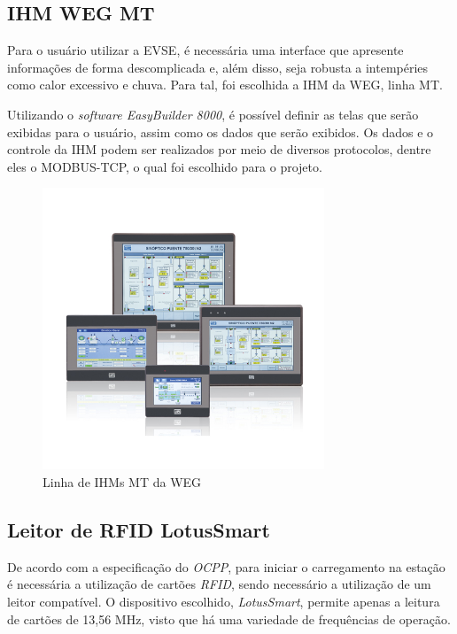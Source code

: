     \subsection{IHM WEG MT}
    \label{methodology:devices:ihm}

      Para o usuário utilizar a \ac{EVSE}, é necessária uma interface que apresente informações de forma descomplicada e, além disso, seja robusta a intempéries como calor excessivo e chuva. Para tal, foi escolhida a \ac{IHM} da WEG, linha MT.

      Utilizando o \textit{software EasyBuilder 8000}, é possível definir as telas que serão exibidas para o usuário, assim como os dados que serão exibidos. Os dados e o controle da IHM podem ser realizados por meio de diversos protocolos, dentre eles o MODBUS-TCP, o qual foi escolhido para o projeto.

      \begin{figure}[H]
        \begin{center}
          \includegraphics[width=0.75\textwidth,natwidth=400,natheight=288]{assets/images/devices-hmi.jpg}
          \caption{Linha de IHMs MT da WEG}
          \label{fig:ihm}
        \end{center}
      \end{figure}

    \subsection{Leitor de RFID LotusSmart}
    \label{methodology:devices:rfid}

      De acordo com a especificação do \textit{\ac{OCPP}}, para iniciar o carregamento na estação é necessária a utilização de cartões \textit{\ac{RFID}}, sendo necessário a utilização de um leitor compatível. O dispositivo escolhido, \textit{LotusSmart}, permite apenas a leitura de cartões de 13,56 MHz, visto que há uma variedade de frequências de operação.

